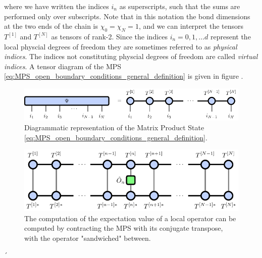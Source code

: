 where we have written the indices $i_n$ as superscripts, such that the sums are performed only over subscripts. Note that in this notation the bond dimensions at the two ends of the chain is $\chi_0 = \chi_{N} = 1$, and we can interpret the tensors $T^{[1]}$ and $T^{[N]}$ as tensors of rank-2. Since the indices $i_n = 0, 1, \dots d$ represent the local physcial degrees of freedom they are sometimes referred to as \textit{physical indices}. The indices not constituting physcial degrees of freedom are called \textit{virtual indices}. A tensor diagram of the MPS \eqref{eq:MPS_open_boundary_conditions_general_definition} is given in figure .\par
\begin{figure}
	\centering
	\includegraphics[scale=1]{figures/tikz/Tensor_Networks/mps_basic/mps_basic.pdf}
	\caption{Diagrammatic representation of the Matrix Product State \ref{eq:MPS_open_boundary_conditions_general_definition}.}
	\label{fig:mps_general}
\end{figure}
\begin{figure}
\centering
\includegraphics[scale=1]{figures/tikz/Tensor_Networks/mps_local_expectation_value/mps_local_expectation_value.pdf}
\caption{The computation of the expectation value of a local operator can be computed by contracting the MPS with its conjugate transpose, with the operator "sandwiched" between.}
\label{fig:mps_local_expectation_value}
\end{figure}´
